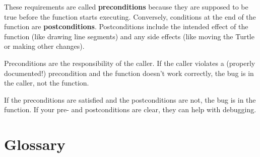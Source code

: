 \documentclass[10pt]{book}
\begin{document}
These requirements are called {\bf preconditions} because they
are supposed to be true before the function starts executing.
Conversely, conditions at the end of the function are
{\bf postconditions}.  Postconditions include the intended
effect of the function (like drawing line segments) and any
side effects (like moving the Turtle or making other changes).

Preconditions are the responsibility of the caller.  If the caller
violates a (properly documented!) precondition and the function
doesn't work correctly, the bug is in the caller, not the function.

If the preconditions are satisfied and the postconditions are
not, the bug is in the function.  If your pre- and postconditions
are clear, they can help with debugging.


\section{Glossary}
\end{document}
